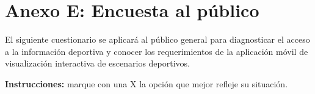 
\section{Anexo E: Encuesta al p\'ublico}

El siguiente cuestionario se aplicar\'a al p\'ublico general para diagnosticar
el acceso a la informaci\'on deportiva y conocer los requerimientos de la
aplicaci\'on m\'ovil de visualizaci\'on interactiva de escenarios deportivos.

\textbf{Instrucciones:} marque con una X la opci\'on que mejor refleje su
situaci\'on.

